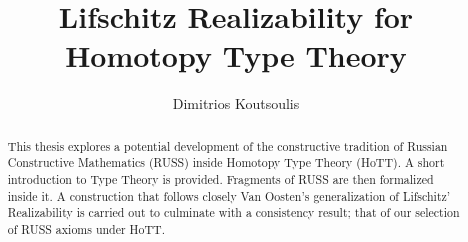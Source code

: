 \documentclass[12pt]{report}
\theoremstyle{definition}
\begin{document}
 
\title{Lifschitz Realizability for Homotopy Type Theory}%
\author{Dimitrios Koutsoulis} %

{\parskip=0pt
\maketitle}
\begin{abstract}
This thesis explores a potential development of the constructive tradition of Russian Constructive Mathematics (RUSS) inside Homotopy Type Theory (HoTT). 
A short introduction to Type Theory is provided. 
Fragments of RUSS are then formalized inside it. 
A construction that follows closely Van Oosten's generalization of Lifschitz' Realizability is carried out to culminate with a consistency result; that of our selection of RUSS axioms under HoTT. 
\end{abstract}

\tableofcontents
\end{document}
